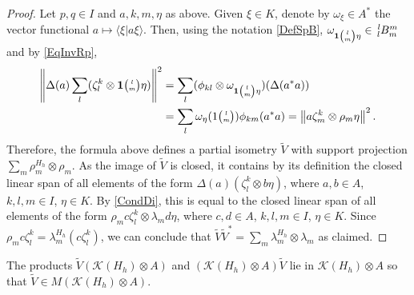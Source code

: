  \begin{proof}
   Let $p,q\in I$ and $a,k,m,\eta$ as above. Given $\xi \in K$, denote by $\omega_{\xi}\in A^{*}$ the vector
   functional $a \mapsto \langle \xi|a\xi\rangle$.%
   Then, using the notation \eqref{DefSpB}, $\omega_{\UnitC{l}{m}\eta} \in \Gr{B}{l}{m}{l}{m}$ and by \eqref{EqInvRp},
   \begin{align*}
  \left\|\Delta(a)\sum_{l}(\zeta^{k}_{l}\otimes \mathbf{1}{\tiny {\begin{pmatrix} l\\m\end{pmatrix}}}\eta)\right\|^{2} &= \sum_{l} (\phi_{kl}
  \otimes \omega_{\mathbf{1}{\tiny {\begin{pmatrix} l\\m\end{pmatrix}}}\eta})(\Delta(a^{*}a)) \\
  &= \sum_{l}\omega_{\eta}(1{\tiny \begin{pmatrix} l \\ m\end{pmatrix}}) \phi_{km}(a^{*}a) 
  = \left\|a\zeta^{k}_{m} \otimes  \rho_{m}\eta \right\|^{2}.
\end{align*}
Therefore, the formula above defines a partial isometry $\tilde V$ with support projection $\sum_{m}
\rho^{H_{h}}_{m} \otimes \rho_{m}$. %
As the image of $\tilde V$ is closed, it contains by its definition the closed linear span of all elements of the form
$\Delta(a) (\zeta^{k}_{l} \otimes b\eta)$, where $a,b\in A$, $k,l,m\in I$, $\eta\in K$. By  \eqref{CondDi}, this is equal to the closed linear span of all
elements of the form $\rho_{m}c \zeta^{k}_{l} \otimes \lambda_{m}d\eta$,
where $c,d\in A$, $k,l,m \in I$, $\eta\in K$. Since $\rho_{m}c\zeta^{k}_{l} =%
\lambda^{H_{h}}_{m}(c\zeta^{k}_{l})$, we can conclude that $\tilde V \tilde V^{*}=\sum_{m} \lambda^{H_{h}}_{m}
\otimes \lambda_{m}$ as claimed.
 \end{proof}
 \begin{Lem}\label{lem:reg-corep-mult}
   The products $ \tilde V(\mathcal{K}(H_{h})\otimes A)$ and 
   $(\mathcal{K}(H_{h}) \otimes A)\tilde V$ lie in %
  $\mathcal{K}(H_h)\otimes A$ so that $\tilde V \in M(\mathcal{K}(H_h)\otimes A)$.
 \end{Lem}
